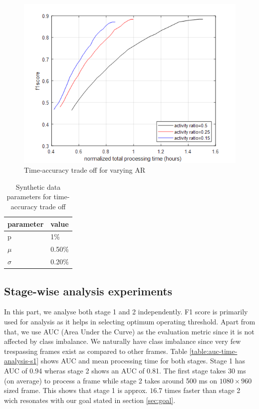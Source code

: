 \begin{figure}
    \centering
    \includegraphics[width=\linewidth]{images/time-acc-tradeoff-ar-mog.png}
    \caption{Time-accuracy trade off for varying AR}
    \label{fig:time-acc-tradeoff-ar-mog}
\end{figure}

\begin{table}
\centering
\caption{Synthetic data parameters for time-accuracy trade off} \vspace{5pt}
\label{table:fig1_data_params}
\begin{tabular}{|l|l|}
\hline
parameter             & value  \\ \hline \hline
p                     & 1\%    \\ 
$\mu$    & 0.50\% \\ 
$\sigma$ & 0.20\% \\ \hline
\end{tabular}
\end{table}

\subsection{Stage-wise analysis experiments}
In this part, we analyse both stage 1 and 2 independently. F1 score is primarily used for analysis as it helps in selecting optimum operating threshold. Apart from that, we use AUC (Area Under the Curve) as the evaluation metric since it is not affected by class imbalance. We naturally have class imbalance since very few trespassing frames exist as compared to other frames. Table \ref{table:auc-time-analysis-s1} shows AUC and mean processing time for both stages. Stage 1 has AUC of 0.94 wheras stage 2 shows an AUC of 0.81. The first stage takes 30 ms  (on average) to process a frame while stage 2 takes around 500 ms on $1080 \times 960$ sized frame. This shows that stage 1 is approx. $16.7$ times faster than stage 2 wich resonates with our goal stated in section \ref{sec:goal}. 

